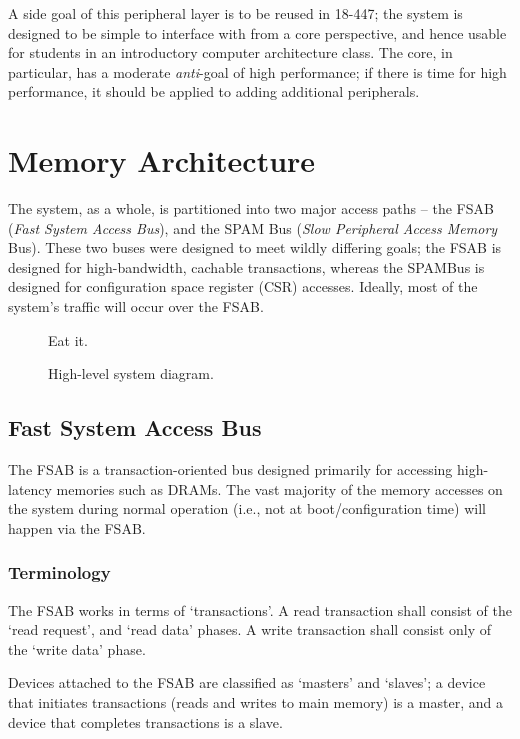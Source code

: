 \documentclass[10pt,twocolumn]{article}
\begin{document}
A side goal of this peripheral layer is to be reused in 18-447; the system
is designed to be simple to interface with from a core perspective, and
hence usable for students in an introductory computer architecture class. 
The core, in particular, has a moderate \textit{anti}-goal of high
performance; if there is time for high performance, it should be applied to
adding additional peripherals.

\section{Memory Architecture}

The system, as a whole, is partitioned into two major access paths -- the
FSAB (\textit{Fast System Access Bus}), and the SPAM Bus (\textit{Slow
Peripheral Access Memory} Bus).  These two buses were designed to meet
wildly differing goals; the FSAB is designed for high-bandwidth, cachable
transactions, whereas the SPAMBus is designed for configuration space
register (CSR) accesses.  Ideally, most of the system's traffic will occur
over the FSAB.

\begin{figure}
  \centering
    Eat it.
  \caption{High-level system diagram.} \label{system_diagram}
\end{figure}

\subsection{Fast System Access Bus}

The FSAB is a transaction-oriented bus designed primarily for accessing
high-latency memories such as DRAMs. The vast majority of the memory
accesses on the system during normal operation (i.e., not at
boot/configuration time) will happen via the FSAB.

\subsubsection{Terminology}

The FSAB works in terms of `transactions'. A read transaction shall consist
of the `read request', and `read data' phases. A write transaction shall
consist only of the `write data' phase.

Devices attached to the FSAB are classified as `masters' and `slaves'; a
device that initiates transactions (reads and writes to main memory) is a
master, and a device that completes transactions is a slave.
\end{document}
